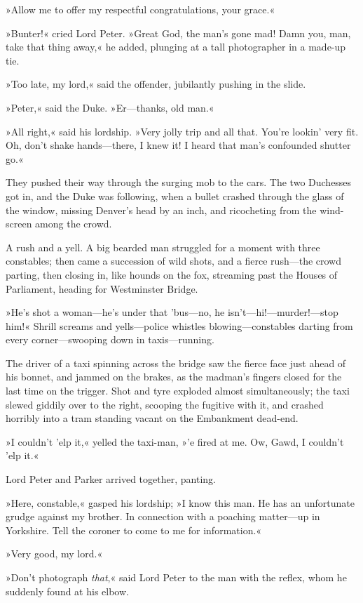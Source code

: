 »Allow me to offer my respectful congratulations, your grace.«

»Bunter!« cried Lord Peter. »Great God, the man's gone mad! Damn you, man, take that thing away,« he added, plunging at a tall photographer in a made-up tie.

»Too late, my lord,« said the offender, jubilantly pushing in the slide.

»Peter,« said the Duke. »Er—thanks, old man.«

»All right,« said his lordship. »Very jolly trip and all that. You're lookin' very fit. Oh, don't shake hands—there, I knew it! I heard that man's confounded shutter go.«

They pushed their way through the surging mob to the cars. The two Duchesses got in, and the Duke was following, when a bullet crashed through the glass of the window, missing Denver's head by an inch, and ricocheting from the wind-screen among the crowd.

A rush and a yell. A big bearded man struggled for a moment with three constables; then came a succession of wild shots, and a fierce rush—the crowd parting, then closing in, like hounds on the fox, streaming past the Houses of Parliament, heading for Westminster Bridge.

»He's shot a woman—he's under that 'bus—no, he isn't—hi!—murder!—stop him!« Shrill screams and yells—police whistles blowing—constables darting from every corner—swooping down in taxis—running.

The driver of a taxi spinning across the bridge saw the fierce face just ahead of his bonnet, and jammed on the brakes, as the madman's fingers closed for the last time on the trigger. Shot and tyre exploded almost simultaneously; the taxi slewed giddily over to the right, scooping the fugitive with it, and crashed horribly into a tram standing vacant on the Embankment dead-end.

»I couldn't 'elp it,« yelled the taxi-man, »'e fired at me. Ow, Gawd, I couldn't 'elp it.«

Lord Peter and Parker arrived together, panting.

»Here, constable,« gasped his lordship; »I know this man. He has an unfortunate grudge against my brother. In connection with a poaching matter—up in Yorkshire. Tell the coroner to come to me for information.«

»Very good, my lord.«

»Don't photograph \textit{that},« said Lord Peter to the man with the reflex, whom he suddenly found at his elbow.

